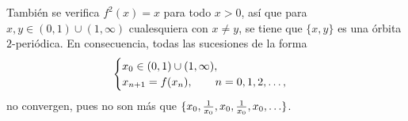 \documentclass[11pt]{report}
\begin{document}
\begin{solution}
\begin{enumerate}
        También se verifica $f^2(x) = x$ para todo $x > 0$, así que para $x,y \in (0,1) \cup (1,\infty)$ cualesquiera con $x \neq y$, se tiene que $\{x,y\}$ es una órbita $2$-periódica. En consecuencia, todas las sucesiones de la forma
        \[\begin{cases}
            x_0 \in (0,1)\cup (1,\infty), \\
            x_{n+1} = f(x_n), \qquad n = 0,1,2,\mathellipsis,
        \end{cases}\]
        no convergen, pues no son más que $\{x_0,\frac{1}{x_0},x_0,\frac{1}{x_0},x_0,\mathellipsis\}$.
    \end{enumerate}
\end{solution}
\end{document}
